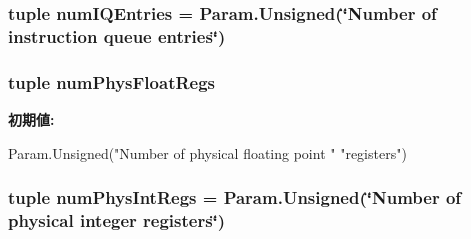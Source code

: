 \label{classSimpleOzoneCPU_1_1SimpleOzoneCPU_ab7876218fa9fd6c9b26081e50523f133}
\hypertarget{classSimpleOzoneCPU_1_1SimpleOzoneCPU_a008b4cba2a3f283c5889144437338721}{
\subsubsection[{numIQEntries}]{\setlength{\rightskip}{0pt plus 5cm}tuple {\bf numIQEntries} = Param.Unsigned(\char`\"{}Number of instruction queue entries\char`\"{})}}
\label{classSimpleOzoneCPU_1_1SimpleOzoneCPU_a008b4cba2a3f283c5889144437338721}
\hypertarget{classSimpleOzoneCPU_1_1SimpleOzoneCPU_aa014e3ffbc9e5c2cdee9cd256bcb9a94}{
\subsubsection[{numPhysFloatRegs}]{\setlength{\rightskip}{0pt plus 5cm}tuple {\bf numPhysFloatRegs}}}
\label{classSimpleOzoneCPU_1_1SimpleOzoneCPU_aa014e3ffbc9e5c2cdee9cd256bcb9a94}
{\bfseries 初期値:}
\begin{DoxyCode}
Param.Unsigned("Number of physical floating point "
               "registers")
\end{DoxyCode}
\hypertarget{classSimpleOzoneCPU_1_1SimpleOzoneCPU_a4872233fcf1f251c1065c07bf3d288b4}{
\subsubsection[{numPhysIntRegs}]{\setlength{\rightskip}{0pt plus 5cm}tuple {\bf numPhysIntRegs} = Param.Unsigned(\char`\"{}Number of physical integer registers\char`\"{})}}
\label{classSimpleOzoneCPU_1_1SimpleOzoneCPU_a4872233fcf1f251c1065c07bf3d288b4}
